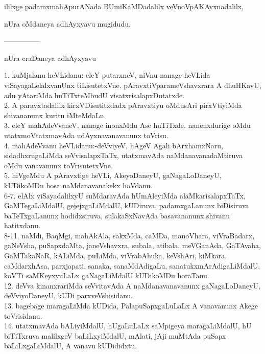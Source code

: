 \documentclass{article}
\begin{document}
\begin{center}
ililxge padamxmahApurANada BUmiKaMDadalilx veVnoVpAKAyxnadalilx,
\end{center}

\begin{center}
nUra oMdaneya adhAyxyavu mugidudu.
\end{center}

\begin{center}
---------------
\end{center}

\begin{center}
nUra eraDaneya adhAyxyavu
\end{center}

1. kuMjalanu heVLidanu:-eleY putarxneV, niVnu nanage heVLida viSayagaLelalxvanUnx tiLisutetxVne. pAravxtiVparameVshavxrara A dhuHKavU, adu yAtariMda huTiTxteMbudU visatxrisalapxDutatxde.\\
2. A paravxtadalilx kirxVDisutitxdadx pAravxtiyu oMdusAri pirxVtiyiMda shivananunx kuritu iMteMdaLu.\\
3. eleY mahAdeVvaneV, nanage inonxMdu Ase huTiTxde. nanenxdurige oMdu utatxmoVtatxmavAda udAyxnavanavanunx toVrisu.\\
4. mahAdeVvanu heVLidanu:-deVviyeV, hAgeV Agali bArxhamxNaru, sidadhxrugaLiMda seVvisalapxTaTx, utatxmavAda naMdanavanadaMtiruva oMdu vanavanunx toVrisutetxVne.\\
5. hiVgeMdu A pAravxtige heVLi, AkeyoDaneyU, gaNagaLoDaneyU, kUDikoMDu hosa naMdanavanakekx hoVdanu.\\
6-7. elAlx viSayadalilxyU suMdaravAda hUmAleyiMda alaMkarisalapxTaTx, GaMTegaLiMdalU, gejejxgaLiMdalU, kUDiruva, padamxgaLanunx biDisiruva baTeTxgaLanunx hodidxsiruva, sulakaSxNavAda basavananunx shivanu hatitxdanu.\\
8-11. naMdi, BaqMgi, mahAkAla, sakxMda, caMDa, manoVhara, viVraBadarx, gaNeVsha, puSapxdaMta, janeVshavxra, subala, atibala, meVGanAda, GaTAvaha, GaMTakaNaR, kALiMda, puLiMda, viVrabAhuka, keVshAri, kiMkara, caMdarxhAsa, parxjapati, sanaka, sanaMdAdigaLu, sanatukxmArAdigaLiMdalU, koVTi saMKeyxyuLaLx gaNagaLiMdalU kUDikoMDu horaTanu.\\
12. deVva kinanxrariMda seVvitavAda A naMdanavanavanunx gaNagaLoDaneyU, deVviyoDaneyU, kUDi parxveVshisidanu.\\
13. bagebage maragaLiMda kUDida, PalapuSapxgaLuLaLx A vanavanunx Akege toVrisidanu.\\
14. utatxmavAda bALiyiMdalU, hUgaLuLaLx saMpigeya maragaLiMdalU, hU biTiTxruva malilxgeV baLiLxyiMdalU, mAlati, jAji muMtAda puSapx baLiLxgaLiMdalU, A vanavu kUDididxtu.\\
\end{document}
